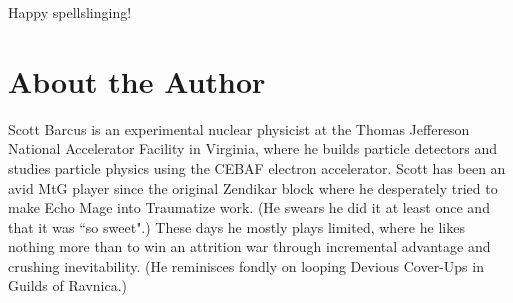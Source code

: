 \documentclass[oneside]{book}   %
\begin{document}
Happy spellslinging!

\section{About the Author}

Scott Barcus is an experimental nuclear physicist at the Thomas Jeffereson National Accelerator Facility in Virginia, where he builds particle detectors and studies particle physics using the CEBAF electron accelerator. Scott has been an avid MtG player since the original Zendikar block where he desperately tried to make Echo Mage into Traumatize work. (He swears he did it at least once and that it was ``so sweet".) These days he mostly plays limited, where he likes nothing more than to win an attrition war through incremental advantage and crushing inevitability. (He reminisces fondly on looping Devious Cover-Ups in Guilds of Ravnica.)  



\end{document}
